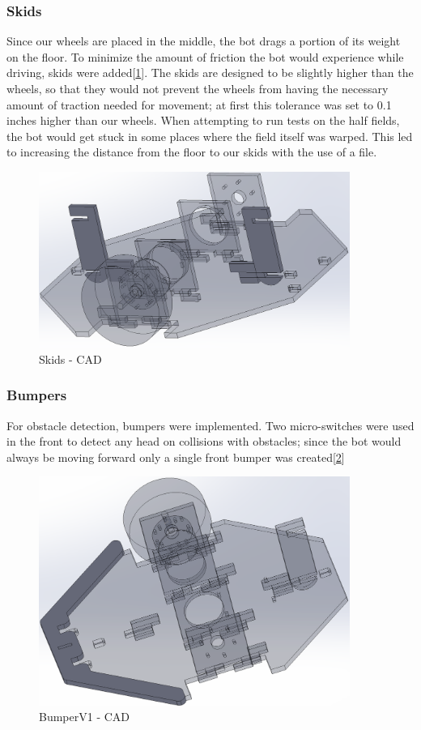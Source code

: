\documentclass{article}
\begin{document}
\subsubsection{Skids}
Since our wheels are placed in the middle, the bot drags a portion of its weight on the floor. To minimize the amount of friction the bot would experience while driving, skids were added[\ref{fig:SkidsCAD}]. The skids are designed to be slightly higher than the wheels, so that they would not prevent the wheels from having the necessary amount of traction needed for movement; at first this tolerance was set to 0.1 inches higher than our wheels. When attempting to run tests on the half fields, the bot would get stuck in some places where the field itself was warped. This led to increasing the distance from the floor to our skids with the use of a file.

\begin{figure}[H]
    \centering
    \includegraphics[width = 4in]{Skids.PNG}
    \caption{Skids - CAD}
    \label{fig:SkidsCAD}
\end{figure}

\subsubsection{Bumpers}
For obstacle detection, bumpers were implemented. Two micro-switches were used in the front to detect any head on collisions with obstacles; since the bot would always be moving forward only a single front bumper was created[\ref{fig:BumperV1CAD}]

\begin{figure}[H]
    \centering
    \includegraphics[width = 4in]{BumperV1.PNG}
    \caption{BumperV1 - CAD}
    \label{fig:BumperV1CAD}
\end{figure}
\end{document}

